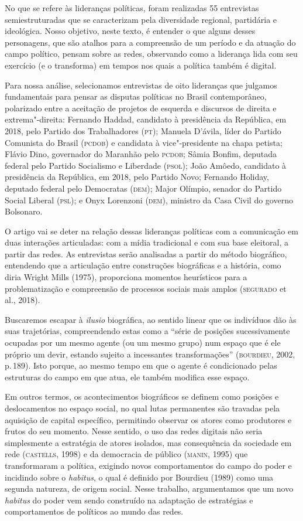 No que se refere às lideranças políticas, foram realizadas 55
entrevistas semiestruturadas que se caracterizam pela diversidade
regional, partidária e ideológica. Nosso objetivo, neste texto, é
entender o que alguns desses personagens, que são atalhos para a
compreensão de um período e da atuação do campo político, pensam sobre
as redes, observando como a liderança lida com seu exercício (e o
transforma) em tempos nos quais a política também é digital.

Para nossa análise, selecionamos entrevistas de oito lideranças que
julgamos fundamentais para pensar as disputas políticas no Brasil
contemporâneo, polarizado entre a aceitação de projetos de esquerda e
discursos de direita e extrema"-direita: Fernando Haddad, candidato à
presidência da República, em 2018, pelo Partido dos Trabalhadores (\textsc{pt});
Manuela D'ávila, líder do Partido Comunista do Brasil (\textsc{pcdob}) e
candidata à vice"-presidente na chapa petista; Flávio Dino, governador do
Maranhão pelo \textsc{pcdob}; Sâmia Bonfim, deputada federal pelo Partido
Socialismo e Liberdade (\textsc{psol}); João Amôedo, candidato à presidência da
República, em 2018, pelo Partido Novo; Fernando Holiday, deputado
federal pelo Democratas (\textsc{dem}); Major Olímpio, senador do Partido Social
Liberal (\textsc{psl}); e Onyx Lorenzoni (\textsc{dem}), ministro da Casa Civil do governo
Bolsonaro.

O artigo vai se deter na relação dessas lideranças políticas com a
comunicação em duas interações articuladas: com a mídia tradicional e
com sua base eleitoral, a partir das redes. As entrevistas serão
analisadas a partir do método biográfico, entendendo que a articulação
entre construções biográficas e a história, como diria Wright Mills
(1975), proporciona momentos heurísticos para a problematização e
compreensão de processos sociais mais amplos (\textsc{segurado} et al., 2018).

Buscaremos escapar à \emph{ilusio} biográfica, ao sentido linear que os
indivíduos dão às suas trajetórias, compreendendo estas como a ``série
de posições sucessivamente ocupadas por um mesmo agente (ou um mesmo
grupo) num espaço que é ele próprio um devir, estando sujeito a
incessantes transformações'' (\textsc{bourdieu}, 2002, p.\,189). Isto porque, ao
mesmo tempo em que o agente é condicionado pelas estruturas do campo em
que atua, ele também modifica esse espaço.

Em outros termos, os acontecimentos biográficos se definem como posições
e deslocamentos no espaço social, no qual lutas permanentes são travadas
pela aquisição de capital específico, permitindo observar os atores como
produtores e frutos do seu momento. Nesse sentido, o uso das redes
digitais não seria simplesmente a estratégia de atores isolados, mas
consequência da sociedade em rede (\textsc{castells}, 1998) e da democracia de
público (\textsc{manin}, 1995) que transformaram a política, exigindo novos
comportamentos do campo do poder e incidindo sobre o \emph{habitus}, o
qual é definido por Bourdieu (1989) como uma segunda natureza, de origem
social. Nesse trabalho, argumentamos que um novo \emph{habitus} do poder
vem sendo construído na adaptação de estratégias e comportamentos de
políticos ao mundo das redes.

